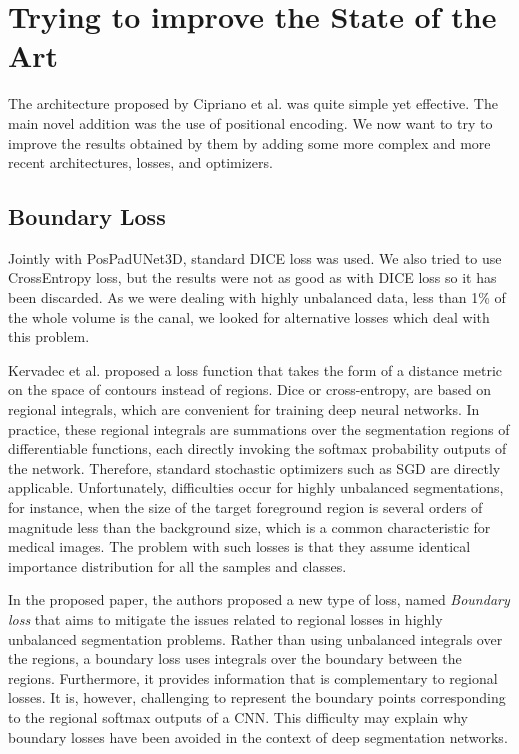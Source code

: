 
\chapter{Trying to improve the State of the Art}

\label{chp:refwork}

\def\:{\hskip0pt} %
The architecture proposed by Cipriano et al. was quite simple yet effective. The
main novel addition was the use of positional encoding. We now want to try to
improve the results obtained by them by adding some more complex
and more recent architectures, losses, and optimizers.

\section{Boundary Loss}
Jointly with PosPadUNet3D, standard DICE loss was used. We also tried to use
CrossEntropy loss, but the results were not as good as with DICE loss so it has
been discarded. As we were dealing with highly unbalanced data, less than 1\% of
the whole volume is the canal, we looked for alternative losses which deal with
this problem.

Kervadec et al. proposed a loss function that takes the form of a distance
metric on the space of contours instead of regions. Dice or cross-entropy, are
based on regional integrals, which are convenient for training deep neural
networks. In practice, these regional integrals are summations over the
segmentation regions of differentiable functions, each directly invoking the
softmax probability outputs of the network. Therefore, standard stochastic
optimizers such as SGD are directly applicable. Unfortunately, difficulties
occur for highly unbalanced segmentations, for instance, when the size of the
target foreground region is several orders of magnitude less than the background
size, which is a common characteristic for medical images. The problem with such
losses is that they assume identical importance distribution for all the samples
and classes.

In the proposed paper, the authors proposed a new type of loss, named
\emph{Boundary loss} that aims to mitigate the issues related to regional losses
in highly unbalanced segmentation problems. Rather than using unbalanced
integrals over the regions, a boundary loss uses integrals over the boundary
between the regions. Furthermore, it provides information that is complementary
to regional losses. It is, however, challenging to represent the boundary points
corresponding to the regional softmax outputs of a CNN. This difficulty may
explain why boundary losses have been avoided in the context of deep
segmentation networks.

